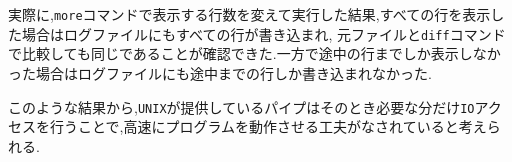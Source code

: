 \documentclass[autodetect-engine, dvi=dvipdfmx, 10pt, a4paper, ja=standard]{bxjsarticle}
\begin{document}
実際に,\verb|more|コマンドで表示する行数を変えて実行した結果,すべての行を表示した場合はログファイルにもすべての行が書き込まれ,
元ファイルと\verb|diff|コマンドで比較しても同じであることが確認できた.一方で途中の行までしか表示しなかった場合はログファイルにも途中までの行しか書き込まれなかった.

このような結果から,\verb|UNIX|が提供しているパイプはそのとき必要な分だけ\verb|IO|アクセスを行うことで,高速にプログラムを動作させる工夫がなされていると考えられる.

\end{document}
